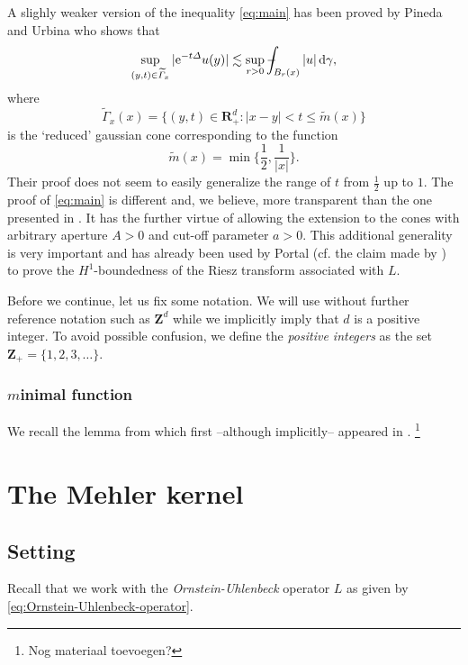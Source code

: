\documentclass[a4paper,oneside,10pt]{amsproc}
\theoremstyle{remark}
\newcommand{\D}{\,\textup{d}}
\def\Xint#1{\mathchoice
  {\XXint\displaystyle\textstyle{#1}}%
  {\XXint\textstyle\scriptstyle{#1}}%
  {\XXint\scriptstyle\scriptscriptstyle{#1}}%
  {\XXint\scriptscriptstyle\scriptscriptstyle{#1}}%
  \!\int}
\def\XXint#1#2#3{{\setbox0=\hbox{$#1{#2#3}{\int}$ }
    \vcenter{\hbox{$#2#3$ }}\kern-.535\wd0}}
\def\dashint{\Xint-}
\renewcommand{\leq}{\leqslant}
\renewcommand{\leq}{\leqslant}
\newcommand{\R}{\mathbf R}
\newcommand{\Z}{\mathbf Z}
\newcommand{\e}{\mathrm{e}} %
\renewcommand{\leq}{\leqslant}%
\begin{document}
A slighly weaker version of the inequality \eqref{eq:main} has been proved by 
Pineda and Urbina \cite{Pineda2008} who 
shows that 
\begin{equation*}
  \sup_{(y, t) \in \widetilde{\Gamma}_x} |\e^{-t \Delta} u(y)|
  \lesssim \sup_{r > 0}  \dashint_{B_r(x)} |u| \D\gamma,
\end{equation*}
where
\begin{equation*}
  \widetilde{\Gamma}_x(x) = \{(y, t) \in \R^d_+ : |x - y| < t \leq
  \widetilde{m}(x)\}
\end{equation*}
is the `reduced' gaussian cone corresponding to the function
\begin{equation*}
  \widetilde{m}(x) = \min\biggl\{\frac12, \frac1{|x|}\biggr\}.
\end{equation*}
Their proof does not seem to easily generalize the range of $t$ from $\frac12$ up
to $1$. The proof of \eqref{eq:main} is different and, we believe, more transparent 
than the one presented in \cite{Pineda2008}. It has the further virtue of allowing 
the extension to the cones
with arbitrary aperture $A>0$ and cut-off parameter $a>0$. This additional generality
is very important and has already been used by Portal (cf. 
the claim made by \cite[discussion preceding Lemma 2.3]{Portal2012}) to prove the 
$H^1$-boundedness of the Riesz transform associated with $L$.

Before we continue, let us fix some notation. We will use without
further reference notation such as $\Z^d$ while we implicitly imply
that $d$ is a positive integer. To avoid possible confusion, we define
the \emph{positive integers} as the set $\Z_+ = \{1, 2, 3, \dots\}$. 


% 
% 
% 

\subsubsection{$m$inimal function}
We recall the lemma from \cite[lemma 2.3]{Maas2011} which first
--although implicitly-- appeared in \cite{Mauceri2007}. \footnote{Nog materiaal toevoegen?}

\section{The Mehler kernel}
\subsection{Setting}
Recall that we work with the \emph{Ornstein-Uhlenbeck} operator $L$ as
given by \eqref{eq:Ornstein-Uhlenbeck-operator}.
\end{document}
